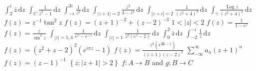 \documentclass[12pt]{article}
\title{}
\author{Jerich Lee}
\date{\today}
\DeclareMathOperator{\Log}{Log}
\theoremstyle{definition} %
\theoremstyle{plain} %
\begin{document}
\maketitle
$\int_{2}^{i} \overline{z}  \,\mathrm{d}z $ 
$\int_{C}^{} \frac{1}{\overline{z}^{2} -1} \,\mathrm{d}z $ 
$\int_{-i}^{3i} \frac{1}{z^{2}} \,\mathrm{d}z $ 
$\int_{\left\vert z+1 \right\vert =2}^{}\frac{z^{2}}{4-z^{2}}  \,\mathrm{d}z $
$\int_{\left\vert z+i \right\vert =2}^{} \frac{1}{(z^{2}+4)^{3}} \,\mathrm{d}z $
$\int_{\gamma}^{}\frac{\Log z}{(z^{2}+4)^{2}}  \,\mathrm{d}z $   
$f(z)=z^{-1}\tan^{2}z$
$f(z)=(z+1)^{-2}+(z-2)^{-3}$
$1<\left\vert z \right\vert <2$   
$f(z)=\frac{1}{1-e^{z}}$ 
$f(z)=\frac{z}{\sin^{2}z}$ 
$\int_{\left\vert z \right\vert =1, 4}^{} \frac{1}{e^{z}-e^{-z}} \,\mathrm{d}z $
$\int_{\left\vert z \right\vert =1}^{}\frac{1}{z^{2}(e^{z}-1)}  \,\mathrm{d}z $  
$\int_{0}^{2} \overline{z}  \,\mathrm{d}z $ 
$\int_{-2}^{-i} \frac{1}{z} \,\mathrm{d}z $
$f(z)=(z^{2}+z-2)^{2}(e^{i\pi z}-1)$  
$f(z)=\frac{z^{2}(e^{\frac{4\pi i}{z}-1})}{(z+1)(z-2)^{3}}$
$\sum_{-\infty}^{\infty} a_{n}(z+1)^{n}$ 
$f(z)=(z-1)^{-1}$
$\left\{ z:\left\vert z+1 \right\vert  >2\right\} $   
$f: A\to B$ and $g: B\to C$  
\end{document}

